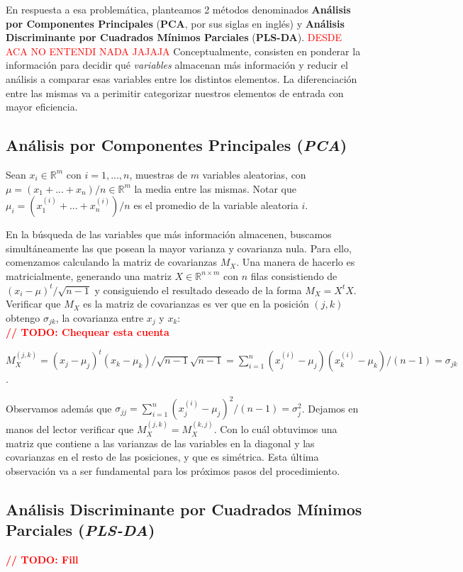 En respuesta a esa problem\'atica, planteamos 2 m\'etodos denominados \textbf{An\'alisis por Componentes Principales} (\textbf{PCA}, por sus siglas en ingl\'es) y \textbf{An\'alisis Discriminante por Cuadrados M\'inimos Parciales} (\textbf{PLS-DA}). \textcolor{red}{DESDE ACA NO ENTENDI NADA JAJAJA} Conceptualmente, consisten en ponderar la informaci\'on para decidir qu\'e \textit{variables} almacenan m\'as informaci\'on y reducir el an\'alisis a comparar esas variables entre los distintos elementos. La diferenciaci\'on entre las mismas va a perimitir categorizar nuestros elementos de entrada con mayor eficiencia.

\subsection{An\'alisis por Componentes Principales (\textit{PCA})}

Sean $x_{i} \in \mathbb{R}^{m}$ con $i = 1, ..., n$, muestras de $m$ variables aleatorias, con $\mu = (x_{1} + ... + x_{n}) / n \in \mathbb{R}^{m}$ la media entre las mismas. Notar que $\mu_{i} = (x_{1}^{(i)} + ... + x_{n}^{(i)}) / n$ es el promedio de la variable aleatoria $i$.

En la b\'usqueda de las variables que m\'as informaci\'on almacenen, buscamos simult\'aneamente las que posean la mayor varianza y covarianza nula. Para ello, comenzamos calculando la matriz de covarianzas $M_{X}$. Una manera de hacerlo es matricialmente, generando una matriz $X \in \mathbb{R}^{n \times m}$ con $n$ filas consistiendo de $(x_{i} - \mu)^t / \sqrt{n - 1}$ y consiguiendo el resultado deseado de la forma $M_{X} = X^{t}X$. Verificar que $M_{X}$ es la matriz de covarianzas es ver que en la posici\'on $(j, k)$ obtengo $\sigma_{jk}$, la covarianza entre $x_{j}$ y $x_{k}$: \\

\textbf{\textcolor{red}{// TODO: Chequear esta cuenta}}

$M_{X}^{(j,k)} = (x_{j} - \mu_{j})^t(x_{k} - \mu_{k}) / \sqrt{n - 1}\sqrt{n - 1} = \sum\limits_{i = 1}^{n}(x_{j}^{(i)} - \mu_{j})(x_{k}^{(i)} - \mu_{k}) / (n - 1) = \sigma_{jk}$.

Observamos adem\'as que $\sigma_{jj} = \sum\limits_{i = 1}^{n}(x_{j}^{(i)} - \mu_{j})^{2} / (n - 1) = \sigma_{j}^{2}$. Dejamos en manos del lector verificar que $M_{X}^{(j,k)} = M_{X}^{(k,j)}$. Con lo cu\'al obtuvimos una matriz que contiene a las varianzas de las variables en la diagonal y las covarianzas en el resto de las posiciones, y que es sim\'etrica. Esta \'ultima observaci\'on va a ser fundamental para los pr\'oximos pasos del procedimiento.

\subsection{An\'alisis Discriminante por Cuadrados M\'inimos Parciales (\textit{PLS-DA})}

\textbf{\textcolor{red}{// TODO: Fill}}